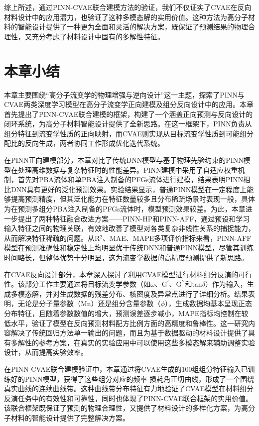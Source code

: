 综上所述，通过PINN-CVAE联合建模方法的验证，我们不仅证实了CVAE在反向材料设计中的应用潜力，也验证了这种多模态解的实用价值。这种方法为高分子材料的智能设计提供了一种更为全面和灵活的解决方案，既保证了预测结果的物理合理性，又充分考虑了材料设计中固有的多解性特征。



\section{本章小结}
本章主要围绕“高分子流变学的物理增强与逆向设计”这一主题，探索了PINN与CVAE两类深度学习模型在高分子流变学正向建模及组分反向设计中的应用。本章首先提出了PINN-CVAE联合建模的框架，构建了一个涵盖正向预测与反向设计的闭环系统，为高分子材料智能设计提供了全新思路。在这一框架下，PINN负责从组分特征到流变学性质的正向映射，而CVAE则实现从目标流变学性质到可能组分配比的反向生成，两者协同工作形成优化迭代系统。

在PINN正向建模部分，本章对比了传统DNN模型与基于物理先验约束的PINN模型在处理高维数据与复杂特征时的性能差异。PINN建模中采用了自适应权重机制，首先对PBA流体和单PBA注入制备的PFGs流体进行建模，结果表明PINN相比DNN具有更好的泛化预测效果。实验结果显示，普通PINN模型在一定程度上能够提高预测精度，但其泛化能力在特征数量较多且分布稀疏场景时表现一般，具体为在预测多组分PBA注入制备的PFGs流体时，模型预测效果较差。为此，本章进一步提出了两种特征融合改进方案——PINN-HP和PINN-AFF，通过预设和学习输入特征之间的物理关联，有效地改善了模型对各类复杂非线性关系的捕捉能力，从而解决特征稀疏的问题。从R$^2$、MAE、MAPE多项评价指标来看，PINN-AFF模型在预测准确性和稳定性上均明显优于传统DNN和普通PINN模型，尽管其训练时间略长，但整体优势十分明显，这为流变学数据的高精度预测提供了新思路。

在CVAE反向设计部分，本章深入探讨了利用CVAE模型进行材料组分反演的可行性。该部分工作主要通过将目标流变学参数（如$\omega$、$\mathrm{G^{\prime}}$、$\mathrm{G^{\prime\prime}}$和tan$\delta$）作为输入，生成多模态解，并对生成数据的残差分布、核密度及异常点进行了详细分析。结果表明，无论是分子量参数（Mn）还是组分含量参数（$\phi$），生成数据均基本呈现正态分布特征，且随着参数数值的增大，预测误差逐步减小，MAPE指标均控制在较低水平，验证了模型在反向预测材料配方比例方面的高精度和鲁棒性。这一研究内容解决了传统回归方法单一输出的问题，而且为基于数据驱动的材料设计提供了具有多解性的参考方案，在真实的实验应用中可以使用这些多模态解来辅助调整实验设计，从而提高实验效率。

在PINN-CVAE联合建模验证中，本章通过将CVAE生成的100组组分特征输入已训练好的PINN模型，获得了这些组分对应的频率-损耗角正切曲线，形成了一个围绕真实曲线的连续曲线带。这种曲线带分布特征有力地验证了CVAE模型在材料组分反演任务中的有效性和可靠性，同时也体现了PINN-CVAE联合框架的实用价值。该联合框架既保证了预测的物理合理性，又提供了材料设计的多样化方案，为高分子材料的智能设计提供了完整解决方案。

